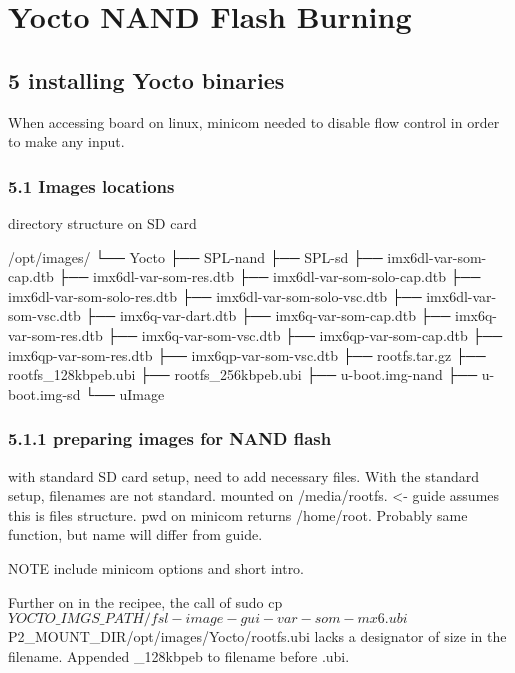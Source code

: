 \documentclass[10pt]{article}
\begin{document}
\section{Yocto NAND Flash Burning}

\subsection{5 installing Yocto binaries}
    When accessing board on linux, minicom needed to disable flow control in order to make any input.

    \subsubsection{5.1 Images locations}
    directory structure on SD card

        /opt/images/
        └── Yocto
            ├── SPL-nand
            ├── SPL-sd
            ├── imx6dl-var-som-cap.dtb
            ├── imx6dl-var-som-res.dtb
            ├── imx6dl-var-som-solo-cap.dtb
            ├── imx6dl-var-som-solo-res.dtb
            ├── imx6dl-var-som-solo-vsc.dtb
            ├── imx6dl-var-som-vsc.dtb
            ├── imx6q-var-dart.dtb
            ├── imx6q-var-som-cap.dtb
            ├── imx6q-var-som-res.dtb
            ├── imx6q-var-som-vsc.dtb
            ├── imx6qp-var-som-cap.dtb
            ├── imx6qp-var-som-res.dtb
            ├── imx6qp-var-som-vsc.dtb
            ├── rootfs.tar.gz
            ├── rootfs\_128kbpeb.ubi
            ├── rootfs\_256kbpeb.ubi
            ├── u-boot.img-nand
            ├── u-boot.img-sd
            └── uImage
        \subsubsection{5.1.1 preparing images for NAND flash }
        with standard SD card setup, need to add necessary files. With the standard setup, filenames are not standard.
        mounted on /media/rootfs. <- guide assumes this is files structure. pwd on minicom returns /home/root. Probably same function, but name will differ from
        guide.

        NOTE include minicom options and short intro.

        Further on in the recipee, the call of sudo cp ${YOCTO\_IMGS\_PATH}/fsl-image-gui-var-som-mx6.ubi ${P2\_MOUNT\_DIR}/opt/images/Yocto/rootfs.ubi
        lacks a designator of size in the filename. Appended \_128kbpeb to filename before .ubi.
\end{document}
